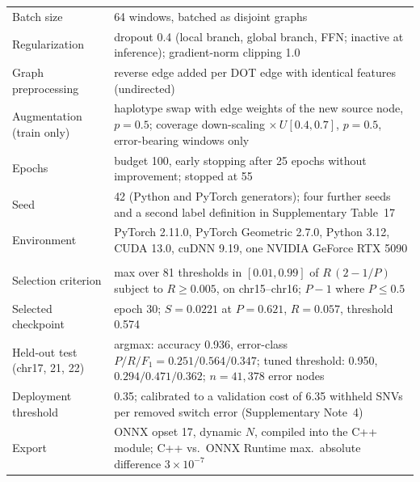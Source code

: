 \documentclass[11pt,a4paper]{article}
\begin{document}
\begin{table}[h]
\begin{tabular}{@{}L{4.6cm} L{10.3cm}@{}}
Batch size & 64 windows, batched as disjoint graphs \\
Regularization & dropout 0.4 (local branch, global branch, FFN; inactive at inference); gradient-norm clipping 1.0 \\
Graph preprocessing & reverse edge added per DOT edge with identical features (undirected) \\
Augmentation (train only) & haplotype swap with edge weights of the new source node, $p = 0.5$; coverage down-scaling $\times\,U[0.4, 0.7]$, $p = 0.5$, error-bearing windows only \\
Epochs & budget 100, early stopping after 25 epochs without improvement; stopped at 55 \\
Seed & 42 (Python and PyTorch generators); four further seeds and a second label definition in Supplementary Table~17 \\
Environment & PyTorch 2.11.0, PyTorch Geometric 2.7.0, Python 3.12, CUDA 13.0, cuDNN 9.19, one NVIDIA GeForce RTX 5090 \\
\addlinespace
{}\\
Selection criterion & max over 81 thresholds in $[0.01, 0.99]$ of $R\,(2 - 1/P)$ subject to $R \ge 0.005$, on chr15--chr16; $P - 1$ where $P \le 0.5$ \\
Selected checkpoint & epoch 30; $S = 0.0221$ at $P = 0.621$, $R = 0.057$, threshold 0.574 \\
Held-out test (chr17, 21, 22) & argmax: accuracy 0.936, error-class $P/R/F_1 = 0.251/0.564/0.347$; tuned threshold: 0.950, $0.294/0.471/0.362$; $n = 41{,}378$ error nodes \\
Deployment threshold & 0.35; calibrated to a validation cost of 6.35 withheld SNVs per removed switch error (Supplementary Note~4) \\
Export & ONNX opset 17, dynamic $N$, compiled into the C++ module; C++ vs.\ ONNX Runtime max.\ absolute difference $3 \times 10^{-7}$ \\
\bottomrule
\end{tabular}
\end{table}
\FloatBarrier
\end{document}
